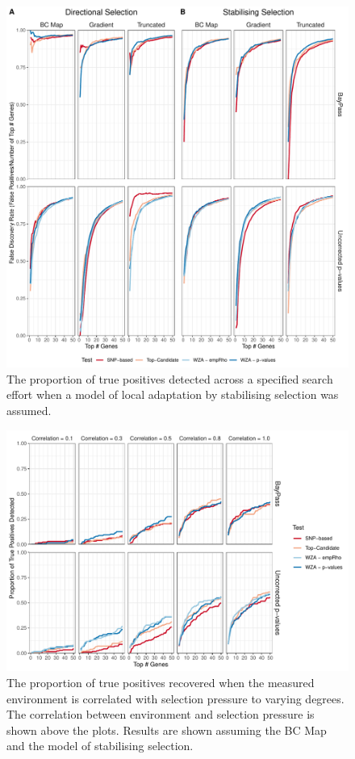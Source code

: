\documentclass[11pt,twoside,lineno]{GSA_format}
\begin{document}
\begin{figure}[H]
  \includegraphics[width=\linewidth]{Plots/UncorrectedBayPassComparison_FalsePositives.pdf} 
  \caption{The proportion of true positives detected across a specified search effort when a model of local adaptation  by stabilising selection was assumed.}

  \label{fig:truePosStabilising}
\end{figure}


\begin{figure}[H]
  \includegraphics[width=\linewidth]{Plots/correlatedEnvironments_BCmapResults.pdf} 
  \caption{The proportion of true positives recovered when the measured environment is correlated with selection pressure to varying degrees. The correlation between environment and selection pressure is shown above the plots. Results are shown assuming the BC Map and the model of stabilising selection.}

  \label{fig:truePosStabilising}
\end{figure}
\end{document}
